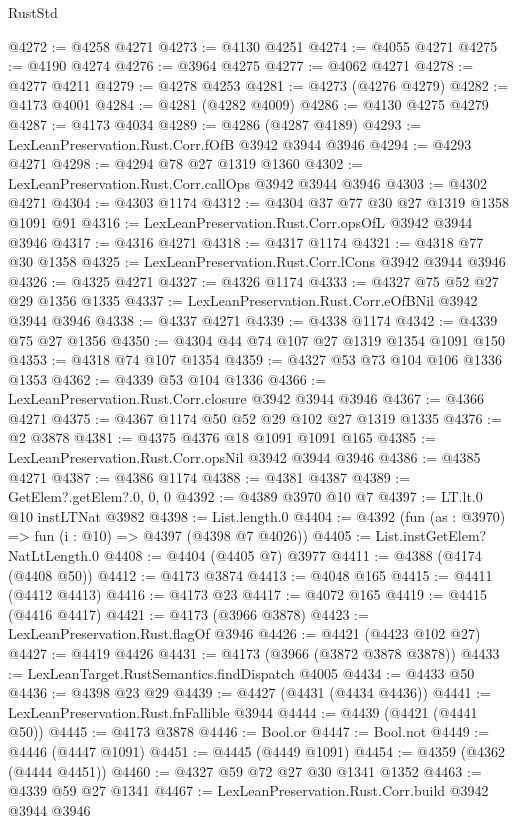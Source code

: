 \begin{lexlean}{RustStd}
\begin{coremodule}
{\begin{coremodule}
{{{{{{{{{{{{{{{{{{{{{{{{{{{{{{{{{{{{{{@4272 := @4258 @4271
@4273 := @4130 @4251
@4274 := @4055 @4271
@4275 := @4190 @4274
@4276 := @3964 @4275
@4277 := @4062 @4271
@4278 := @4277 @4211
@4279 := @4278 @4253
@4281 := @4273 (@4276 @4279)
@4282 := @4173 @4001
@4284 := @4281 (@4282 @4009)
@4286 := @4130 @4275 @4279
@4287 := @4173 @4034
@4289 := @4286 (@4287 @4189)
@4293 := LexLeanPreservation.Rust.Corr.fOfB @3942 @3944 @3946
@4294 := @4293 @4271
@4298 := @4294 @78 @27 @1319 @1360
@4302 := LexLeanPreservation.Rust.Corr.callOps @3942 @3944 @3946
@4303 := @4302 @4271
@4304 := @4303 @1174
@4312 := @4304 @37 @77 @30 @27 @1319 @1358 @1091 @91
@4316 := LexLeanPreservation.Rust.Corr.opsOfL @3942 @3944 @3946
@4317 := @4316 @4271
@4318 := @4317 @1174
@4321 := @4318 @77 @30 @1358
@4325 := LexLeanPreservation.Rust.Corr.lCons @3942 @3944 @3946
@4326 := @4325 @4271
@4327 := @4326 @1174
@4333 := @4327 @75 @52 @27 @29 @1356 @1335
@4337 := LexLeanPreservation.Rust.Corr.eOfBNil @3942 @3944 @3946
@4338 := @4337 @4271
@4339 := @4338 @1174
@4342 := @4339 @75 @27 @1356
@4350 := @4304 @44 @74 @107 @27 @1319 @1354 @1091 @150
@4353 := @4318 @74 @107 @1354
@4359 := @4327 @53 @73 @104 @106 @1336 @1353
@4362 := @4339 @53 @104 @1336
@4366 := LexLeanPreservation.Rust.Corr.closure @3942 @3944 @3946
@4367 := @4366 @4271
@4375 := @4367 @1174 @50 @52 @29 @102 @27 @1319 @1335
@4376 := @2 @3878
@4381 := @4375 @4376 @18 @1091 @1091 @165
@4385 := LexLeanPreservation.Rust.Corr.opsNil @3942 @3944 @3946
@4386 := @4385 @4271
@4387 := @4386 @1174
@4388 := @4381 @4387
@4389 := GetElem?.getElem?.{0, 0, 0}
@4392 := @4389 @3970 @10 @7
@4397 := LT.lt.{0} @10 instLTNat @3982
@4398 := List.length.{0}
@4404 := @4392 (fun (as : @3970) => fun (i : @10) => @4397 (@4398 @7 @4026))
@4405 := List.instGetElem?NatLtLength.{0}
@4408 := @4404 (@4405 @7) @3977
@4411 := @4388 (@4174 (@4408 @50))
@4412 := @4173 @3874
@4413 := @4048 @165
@4415 := @4411 (@4412 @4413)
@4416 := @4173 @23
@4417 := @4072 @165
@4419 := @4415 (@4416 @4417)
@4421 := @4173 (@3966 @3878)
@4423 := LexLeanPreservation.Rust.flagOf @3946
@4426 := @4421 (@4423 @102 @27)
@4427 := @4419 @4426
@4431 := @4173 (@3966 (@3872 @3878 @3878))
@4433 := LexLeanTarget.RustSemantics.findDispatch @4005
@4434 := @4433 @50
@4436 := @4398 @23 @29
@4439 := @4427 (@4431 (@4434 @4436))
@4441 := LexLeanPreservation.Rust.fnFallible @3944
@4444 := @4439 (@4421 (@4441 @50))
@4445 := @4173 @3878
@4446 := Bool.or
@4447 := Bool.not
@4449 := @4446 (@4447 @1091)
@4451 := @4445 (@4449 @1091)
@4454 := @4359 (@4362 (@4444 @4451))
@4460 := @4327 @59 @72 @27 @30 @1341 @1352
@4463 := @4339 @59 @27 @1341
@4467 := LexLeanPreservation.Rust.Corr.build @3942 @3944 @3946
}}}}}}}}}}}}}}}}}}}}}}}}}}}}}}}}}}}}}}
\end{coremodule}}
\end{coremodule}
\end{lexlean}
